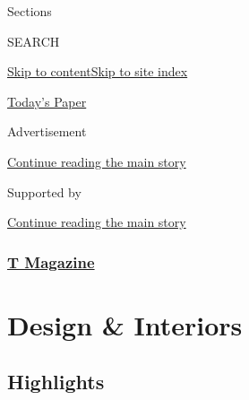 Sections

SEARCH

\protect\hyperlink{site-content}{Skip to
content}\protect\hyperlink{site-index}{Skip to site index}

\href{https://myaccount.nytimes3xbfgragh.onion/auth/login?response_type=cookie\&client_id=vi}{}

\href{https://www.nytimes3xbfgragh.onion/section/todayspaper}{Today's
Paper}

Advertisement

\protect\hyperlink{after-top}{Continue reading the main story}

Supported by

\protect\hyperlink{after-sponsor}{Continue reading the main story}

\hypertarget{t-magazine}{%
\subsubsection{\texorpdfstring{\href{/section/t-magazine}{T
Magazine}}{T Magazine}}\label{t-magazine}}

\hypertarget{design--interiors}{%
\section{Design \& Interiors}\label{design--interiors}}

\hypertarget{highlights}{%
\subsection{Highlights}\label{highlights}}

